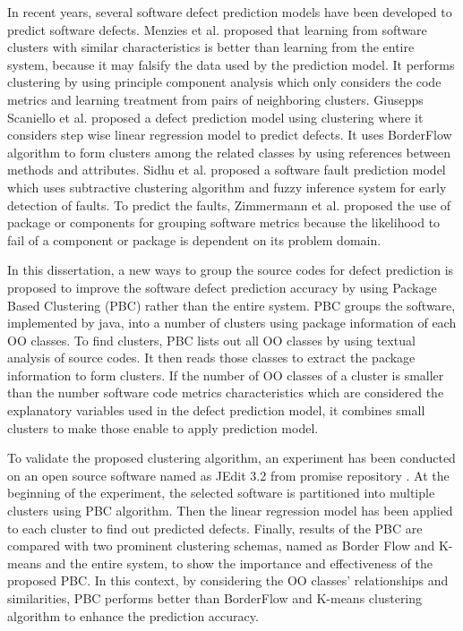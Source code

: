 \documentclass[12pt]{report}
\begin{document}
In recent years, several software defect prediction models have been developed to predict software defects. Menzies et al. \cite{menzies2013local,menzies2011local} proposed that learning from software clusters with similar characteristics is better than learning from the entire system, because it may falsify the data used by the prediction model. It performs clustering by using principle component analysis which only considers the code metrics and learning treatment from pairs of neighboring clusters. Giusepps Scaniello et al.\cite{scanniello2013class} proposed a defect prediction model using clustering where it considers step wise linear regression model to predict defects. It uses BorderFlow algorithm to form clusters among the related classes by using references between methods and attributes. Sidhu et al. \cite{sidhu2010subtractive} proposed a software fault prediction model which uses subtractive clustering algorithm and fuzzy inference system for early detection of faults. To predict the faults, Zimmermann et al.\cite{zimmermann2007predicting}  proposed the use of package or components for grouping software metrics because the likelihood to fail of a component or package is dependent on its problem domain.

In this dissertation, a new ways to group the source codes for defect prediction is proposed to improve the software defect prediction accuracy by using Package Based Clustering (PBC) rather than the entire system.
PBC groups the software, implemented by java, into a number of clusters using package information of each OO classes. To find clusters, PBC lists out all OO classes by using textual analysis of source codes. It then reads those classes to extract the package information to form clusters. If the number of OO classes of a cluster is smaller than the number software code metrics characteristics which are considered the explanatory variables used in the defect prediction model, it combines small clusters to make those enable to apply prediction model.

To validate the proposed clustering algorithm, an experiment has been conducted on an open source software named as JEdit 3.2 from promise repository \cite{promise12}. At the beginning of the experiment, the selected software is partitioned into multiple clusters using PBC algorithm. Then the linear regression model has been applied to each cluster to find out predicted defects. Finally, results of the PBC are compared with two prominent clustering schemas, named as Border Flow and K-means and the entire system, to show the importance and effectiveness of the proposed PBC. In this context, by considering the OO classes' relationships and similarities, PBC performs better than BorderFlow and K-means clustering algorithm to enhance the prediction accuracy.
\end{document}
